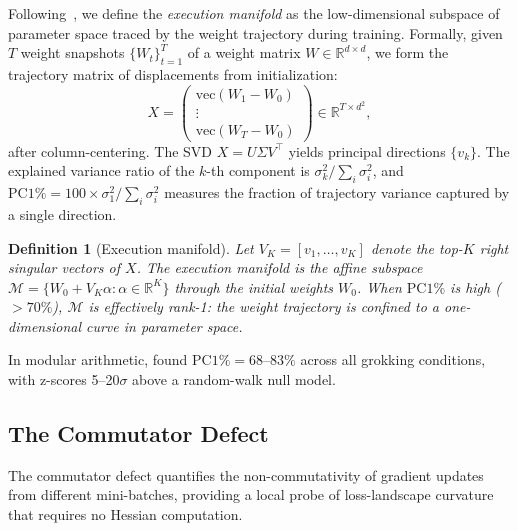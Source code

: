 \documentclass[11pt]{article}
\newcommand{\R}{\mathbb{R}}
\newtheorem{definition}{Definition}
\begin{document}
Following~\citet{xu2026integrability}, we define the \emph{execution manifold} as the low-dimensional subspace of parameter space traced by the weight trajectory during training. Formally, given $T$ weight snapshots $\{W_t\}_{t=1}^{T}$ of a weight matrix $W \in \R^{d \times d}$, we form the trajectory matrix of displacements from initialization:
\begin{equation}
  X = \begin{pmatrix} \text{vec}(W_1 - W_0) \\ \vdots \\ \text{vec}(W_T - W_0) \end{pmatrix} \in \R^{T \times d^2},
  \label{eq:trajectory_matrix}
\end{equation}
after column-centering. The SVD $X = U \Sigma V^\top$ yields principal directions $\{v_k\}$. The explained variance ratio of the $k$-th component is $\sigma_k^2 / \sum_i \sigma_i^2$, and $\text{PC1\%} = 100 \times \sigma_1^2 / \sum_i \sigma_i^2$ measures the fraction of trajectory variance captured by a single direction.

\begin{definition}[Execution manifold]
Let $V_K = [v_1, \ldots, v_K]$ denote the top-$K$ right singular vectors of $X$. The \emph{execution manifold} is the affine subspace $\mathcal{M} = \{W_0 + V_K \alpha : \alpha \in \R^K\}$ through the initial weights $W_0$. When $\text{PC1\%}$ is high ($> 70\%$), $\mathcal{M}$ is effectively rank-1: the weight trajectory is confined to a one-dimensional curve in parameter space.
\end{definition}

In modular arithmetic, \citet{xu2026integrability} found $\text{PC1\%} = 68$--$83\%$ across all grokking conditions, with z-scores 5--20$\sigma$ above a random-walk null model.

\subsection{The Commutator Defect}
\label{sec:commutator_defect_def}

The commutator defect quantifies the non-commutativity of gradient updates from different mini-batches, providing a local probe of loss-landscape curvature that requires no Hessian computation.
\end{document}

